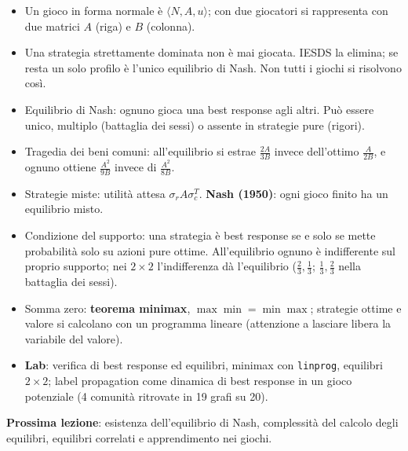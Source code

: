 \begin{riepilogo}
\begin{itemize}
  \item Un gioco in forma normale è $\langle N, A, u\rangle$; con due giocatori si
        rappresenta con due matrici $A$ (riga) e $B$ (colonna).
  \item Una strategia strettamente dominata non è mai giocata. IESDS la elimina; se resta
        un solo profilo è l'unico equilibrio di Nash. Non tutti i giochi si risolvono così.
  \item Equilibrio di Nash: ognuno gioca una best response agli altri. Può essere unico,
        multiplo (battaglia dei sessi) o assente in strategie pure (rigori).
  \item Tragedia dei beni comuni: all'equilibrio si estrae $\tfrac{2A}{3B}$ invece
        dell'ottimo $\tfrac{A}{2B}$, e ognuno ottiene $\tfrac{A^2}{9B}$ invece di
        $\tfrac{A^2}{8B}$.
  \item Strategie miste: utilità attesa $\sigma_r A\sigma_c^T$. \textbf{Nash (1950)}: ogni
        gioco finito ha un equilibrio misto.
  \item Condizione del supporto: una strategia è best response se e solo se mette
        probabilità solo su azioni pure ottime. All'equilibrio ognuno è indifferente sul
        proprio supporto; nei $2\times2$ l'indifferenza dà l'equilibrio
        ($\tfrac23,\tfrac13$; $\tfrac13,\tfrac23$ nella battaglia dei sessi).
  \item Somma zero: \textbf{teorema minimax}, $\max\min = \min\max$; strategie ottime e
        valore si calcolano con un programma lineare (attenzione a lasciare libera la
        variabile del valore).
  \item \textbf{Lab}: verifica di best response ed equilibri, minimax con \texttt{linprog},
        equilibri $2\times2$; label propagation come dinamica di best response in un gioco
        potenziale (4 comunità ritrovate in 19 grafi su 20).
\end{itemize}
\textbf{Prossima lezione}: esistenza dell'equilibrio di Nash, complessità del calcolo degli
equilibri, equilibri correlati e apprendimento nei giochi.
\end{riepilogo}

